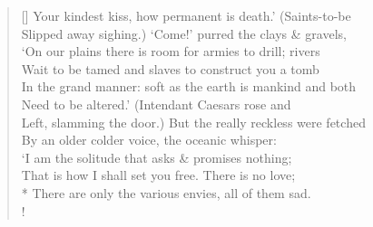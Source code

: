 \documentclass[MAIN]{subfiles}
\begin{document}
\begin{verse}[\versewidth]
Your kindest kiss, how permanent is death.' (Saints-to-be\\
\vin Slipped away sighing.) `Come!' purred the clays \& gravels,\\
`On our plains there is room for armies to drill; rivers\\
\vin Wait to be tamed and slaves to construct you a tomb\\
In the grand manner: soft as the earth is mankind and both\\
\vin Need to be altered.' (Intendant Caesars rose and\\
Left, slamming the door.) But the really reckless were fetched\\
\vin By an older colder voice, the oceanic whisper:\\
`I am the solitude that asks \& promises nothing;\\
\vin That is how I shall set you free. There is no love;\\*
There are only the various envies, all of them sad.\\!


\end{verse}
\end{document}
